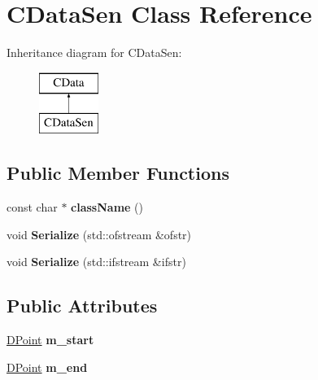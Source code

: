 \hypertarget{classCDataSen}{\section{C\-Data\-Sen Class Reference}
\label{classCDataSen}
}
Inheritance diagram for C\-Data\-Sen\-:\begin{figure}[H]
\begin{center}
\leavevmode
\includegraphics[height=2.000000cm]{classCDataSen}
\end{center}
\end{figure}
\subsection*{Public Member Functions}
\begin{DoxyCompactItemize}
\item 
\hypertarget{classCDataSen_acc7981a0c4ca6eb56b7c8265e27143af}{const char $\ast$ {\bfseries class\-Name} ()}\label{classCDataSen_acc7981a0c4ca6eb56b7c8265e27143af}

\item 
\hypertarget{classCDataSen_a1d61227fc65a369a09496ccb15a6f29a}{void {\bfseries Serialize} (std\-::ofstream \&ofstr)}\label{classCDataSen_a1d61227fc65a369a09496ccb15a6f29a}

\item 
\hypertarget{classCDataSen_a2cb3a98e6307b90dbe7363577e4a0b2b}{void {\bfseries Serialize} (std\-::ifstream \&ifstr)}\label{classCDataSen_a2cb3a98e6307b90dbe7363577e4a0b2b}

\end{DoxyCompactItemize}
\subsection*{Public Attributes}
\begin{DoxyCompactItemize}
\item 
\hypertarget{classCDataSen_a08c84e661ec2112c5da7ff2e61f57989}{\hyperlink{struct__DPoint}{D\-Point} {\bfseries m\-\_\-start}}\label{classCDataSen_a08c84e661ec2112c5da7ff2e61f57989}

\item 
\hypertarget{classCDataSen_a1863d40dd5617041e719c2d711420c06}{\hyperlink{struct__DPoint}{D\-Point} {\bfseries m\-\_\-end}}\label{classCDataSen_a1863d40dd5617041e719c2d711420c06}

\end{DoxyCompactItemize}

